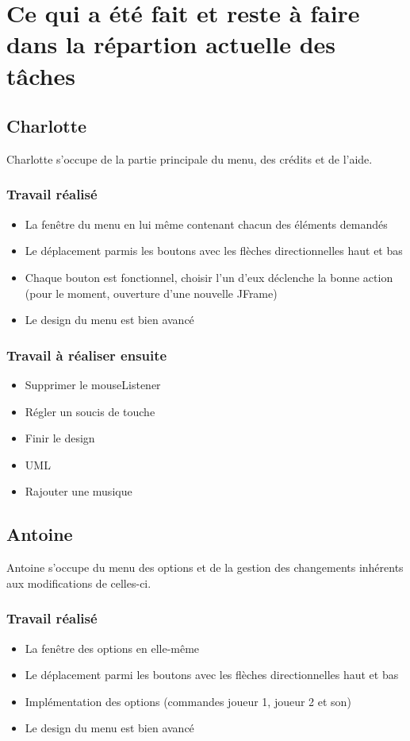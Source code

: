 \documentclass[a4paper,utf8]{article}
\date{20/02/2017}
\begin{document}
\entete

\section{Ce qui a \'et\'e fait et reste \`a faire dans la r\'epartion actuelle des t\^{a}ches}
	\subsection{Charlotte}
		Charlotte s'occupe de la partie principale du menu, des cr\'edits et de l'aide.
		\subsubsection{Travail r\'ealis\'e}
			\begin{itemize}
				\item La fen\^{e}tre du menu en lui m\^{e}me contenant chacun des \'el\'ements demand\'es
				\item Le d\'eplacement parmis les boutons avec les fl\`eches directionnelles haut et bas
				\item Chaque bouton est fonctionnel, choisir l'un d'eux d\'eclenche la bonne action (pour le moment, ouverture d'une nouvelle JFrame)
				\item Le design du menu est bien avanc\'e
			\end{itemize}
		\subsubsection{Travail \`a r\'ealiser ensuite}
			\begin{itemize}
				\item Supprimer le mouseListener
				\item R\'egler un soucis de touche
				\item Finir le design
				\item UML
				\item Rajouter une musique
			\end{itemize}
	\subsection{Antoine}
		Antoine s'occupe du menu des options et de la gestion des changements inh\'erents aux modifications de celles-ci.
		\subsubsection{Travail r\'ealis\'e}
			\begin{itemize}
				\item La fen\^{e}tre des options en elle-m\^{e}me
				\item Le d\'eplacement parmi les boutons avec les fl\`eches directionnelles haut et bas
				\item Impl\'ementation des options (commandes joueur 1, joueur 2 et son)
				\item Le design du menu est bien avanc\'e
			\end{itemize}
\end{document}
